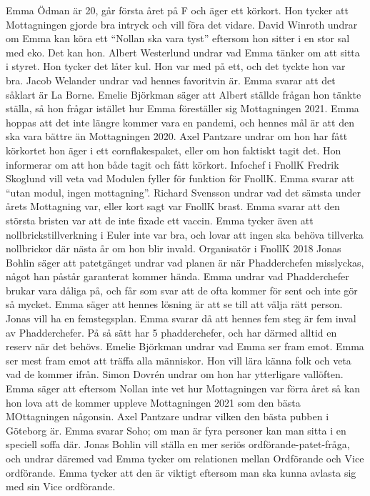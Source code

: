 \documentclass[hidelinks]{sektionsmote} %
\begin{document}
Emma Ödman är 20, går första året på F och äger ett körkort.
Hon tycker att Mottagningen gjorde bra intryck och vill föra det vidare.
David Winroth undrar om Emma kan köra ett \enquote{Nollan ska vara tyst} eftersom hon sitter i en stor sal med eko.
Det kan hon.
Albert Westerlund undrar vad Emma tänker om att sitta i styret.
Hon tycker det låter kul.
Hon var med på ett, och det tyckte hon var bra.
Jacob Welander undrar vad hennes favoritvin är.
Emma svarar att det såklart är La Borne.
Emelie Björkman säger att Albert ställde frågan hon tänkte ställa, så hon frågar istället hur Emma föreställer sig Mottagningen 2021.
Emma hoppas att det inte längre kommer vara en pandemi, och
hennes mål är att den ska vara bättre än Mottagningen 2020.
Axel Pantzare undrar om hon har fått körkortet hon äger i ett cornflakespaket, eller om hon faktiskt tagit det.
Hon informerar om att hon både tagit och fått körkort.
Infochef i FnollK Fredrik Skoglund vill veta vad Modulen fyller för funktion för FnollK.
Emma svarar att \enquote{utan modul, ingen mottagning}.
Richard Svensson undrar vad det sämsta under årets Mottagning var, eller kort sagt var FnollK brast.
Emma svarar att den största bristen var att de inte fixade ett vaccin.
Emma tycker även att nollbrickstillverkning i Euler inte var bra, och lovar att ingen ska behöva tillverka nollbrickor där nästa år om hon blir invald.
Organisatör i FnollK 2018 Jonas Bohlin säger att patetgänget undrar vad planen är när Phadderchefen misslyckas, något han påstår garanterat kommer hända.
Emma undrar vad Phadderchefer brukar vara dåliga på, och får som svar att de ofta kommer för sent och inte gör så mycket.
Emma säger att hennes lösning är att se till att välja rätt person.
Jonas vill ha en femstegsplan.
Emma svarar då att hennes fem steg är fem inval av Phadderchefer.
På så sätt har 5 phadderchefer, och har därmed alltid en reserv när det behövs.
Emelie Björkman undrar vad Emma ser fram emot.
Emma ser mest fram emot att träffa alla människor.
Hon vill lära känna folk och veta vad de kommer ifrån.
Simon Dovrén undrar om hon har ytterligare vallöften.
Emma säger att eftersom Nollan inte vet hur Mottagningen var förra året så kan hon lova att de kommer uppleve Mottagningen 2021 som den bästa MOttagningen någonsin.
Axel Pantzare undrar vilken den bästa pubben i Göteborg är.
Emma svarar Soho; om man är fyra personer kan man sitta i en speciell soffa där.
Jonas Bohlin vill ställa en mer seriös ordförande-patet-fråga, och undrar däremed vad Emma tycker om relationen mellan Ordförande och Vice ordförande.
Emma tycker att den är viktigt eftersom man ska kunna avlasta sig med sin Vice ordförande.
\end{document}

